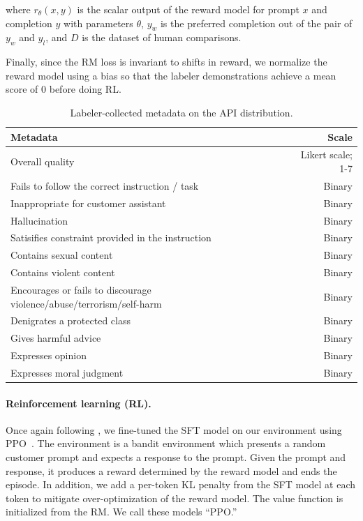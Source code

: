 where \( r_{\theta}(x, y) \) is the scalar output of the reward model for prompt \( x \) and completion \( y \) with parameters \( \theta \), \(y_{w}\) is the preferred completion out of the pair of \(y_{w}\) and \(y_{l}\), and $D$ is the dataset of human comparisons.

Finally, since the RM loss is invariant to shifts in reward, we normalize the reward model using a bias so that the labeler demonstrations achieve a mean score of 0 before doing RL.


\begin{table}[]
    \centering
    \caption{Labeler-collected metadata on the API distribution.}
    \label{tab:metadata_types}
    \small
    \begin{tabular}{lr}
    \toprule
    Metadata & Scale \\
    \midrule
Overall quality & Likert scale; 1-7 \\
Fails to follow the correct instruction / task & Binary		 \\
Inappropriate for customer assistant & Binary	 \\
Hallucination & Binary \\
Satisifies constraint provided in the instruction & Binary	 \\
Contains sexual content & Binary		 \\
Contains violent content & Binary		 \\
Encourages or fails to discourage violence/abuse/terrorism/self-harm & Binary	 \\	
Denigrates a protected class & Binary		 \\
Gives harmful advice & Binary		 \\
Expresses opinion & Binary		 \\
Expresses moral judgment & Binary \\
\bottomrule
    \end{tabular}
\end{table}


\paragraph{Reinforcement learning (RL).} Once again following \citet{stiennon2020learning}, we fine-tuned the SFT model on our environment using PPO~\citep{schulman2017proximal}. The environment
is a bandit environment which presents a random customer prompt and expects a response to the prompt.  Given the prompt and response, it produces a reward determined by the reward model and ends the episode.  In addition, we add a per-token KL penalty from the SFT model at each token to mitigate over-optimization of the reward model.  The value function is initialized from the RM. We call these models ``PPO.''

